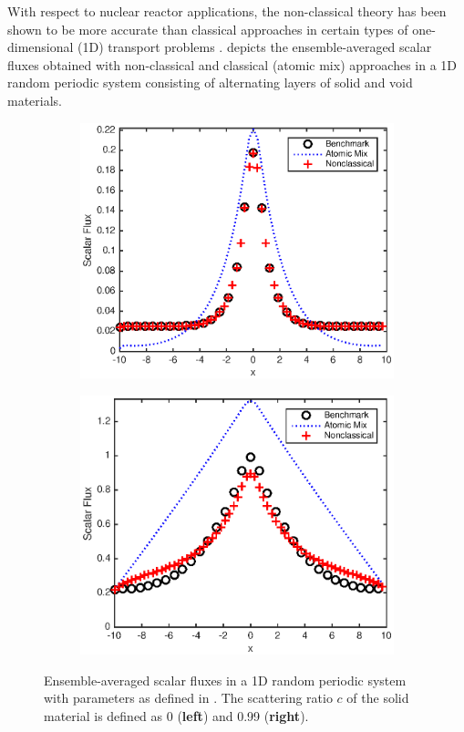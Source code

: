 \documentclass[12pt]{article}
\begin{document}
With respect to nuclear reactor applications, the non-classical theory has been shown to be more accurate than classical approaches in certain types of one-dimensional (1D) transport problems \cite{vaskry16}.
 depicts the ensemble-averaged scalar fluxes obtained with non-classical and classical (atomic mix) approaches in a 1D random periodic system consisting
of alternating layers of solid and void materials.
\begin{figure}[hbt]
    \centering
    \begin{subfigure}{0.48\textwidth}
        \centering
        \includegraphics[width=\textwidth]{fig3a}
    \end{subfigure}
        \begin{subfigure}{0.48\textwidth}
        \centering
        \includegraphics[width=\textwidth]{fig3b}
    \end{subfigure}
    \caption{Ensemble-averaged scalar fluxes in a 1D random periodic system with parameters as defined in \cite{vaskry16}. The scattering ratio $c$ of the solid material is defined as 0 (\textbf{left}) and 0.99 (\textbf{right}).}
    \label{fig3}
\end{figure}
\end{document}
